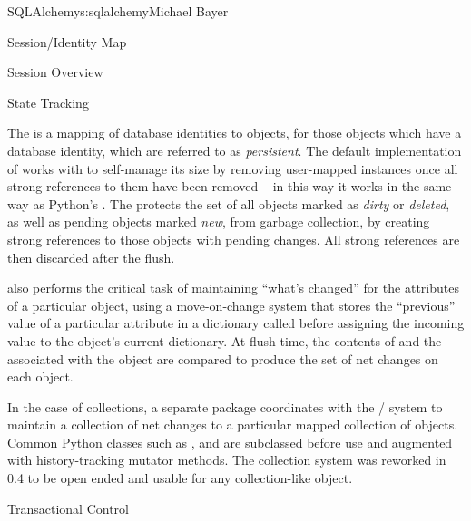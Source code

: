 \begin{aosachapter}{SQLAlchemy}{s:sqlalchemy}{Michael Bayer}
\begin{aosasect1}{Session/Identity Map}
\begin{aosasect2}{Session Overview}
\end{aosasect2}

\begin{aosasect2}{State Tracking}

The  is a mapping of database identities to  objects,
for those objects which have a database identity, which are referred to as \emph{persistent}.
The default implementation of  works with  to self-manage
its size by removing user-mapped instances once all strong references to them have been removed –
in this way it works in the same way as Python's .  The 
protects the set of all objects marked as \emph{dirty} or \emph{deleted}, as well as pending objects
marked \emph{new}, from garbage collection, by creating strong
references to those objects with pending changes.  All strong references are then discarded after the flush.

 also performs the critical task of maintaining ``what's changed''
for the attributes of a particular object, using a move-on-change system that
stores the ``previous'' value of a particular attribute in a dictionary
called  before assigning the incoming value to the
object's current dictionary.   At flush time, the contents of 
and the  associated with the object are compared to produce
the set of net changes on each object.

In the case of collections, a separate  package coordinates
with the /
system to maintain a collection of net changes to a particular mapped collection of
objects.   Common Python classes such as ,  and  are subclassed
before use and augmented with history-tracking mutator methods.   The collection system
was reworked in 0.4 to be open ended and usable for any collection-like object.

\end{aosasect2}

\begin{aosasect2}{Transactional Control}


\end{aosasect2}
\end{aosasect1}
\end{aosachapter}

